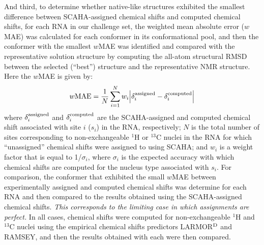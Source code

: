 \documentclass[journal=jcisd8,manuscript=article,layout=onecolumn]{achemso}
\begin{document}
And third, to determine whether native-like structures exhibited the smallest difference between SCAHA-assigned chemical shifts and computed chemical shifts, for each RNA in our challenge set, the weighted mean absolute error ($w$MAE) was calculated for each conformer in its conformational pool, and then the conformer with the smallest $w$MAE was identified and compared with the representative solution structure by computing the all-atom structural RMSD between the selected (``best'')  structure and the representative NMR structure.  Here the $w$MAE is given by:
\begin{equation}\label{eq:wmae} 
w{\rm MAE} =  \frac{1}{N} \sum_{i=1}^{N} w_{i} \Big{|} \delta_{i}^{\rm assigned} - \delta_{i}^{\rm computed}\Big{|}
\end{equation}
where $\delta_{i}^{\rm assigned}$ and $\delta_{i}^{\rm computed}$ are the SCAHA-assigned and computed chemical shift associated with site $i$ ($s_{i}$) in the RNA, respectively; $N$ is the total number of sites corresponding to non-exchangeable $^{1}$H or $^{13}$C nuclei in the RNA for which ``unassigned'' chemical shifts were assigned to using SCAHA; and $w_{i}$ is a weight factor that is equal to 1/$\sigma_{i}$, where $\sigma_{i}$ is the expected accuracy with which chemical shifts are computed for the nucleus type associated with $s_{i}$\cite{frank2016can}. For comparison, the conformer that exhibited the small $w$MAE between experimentally assigned and computed chemical shifts was determine for each RNA and then compared to the results obtained using the SCAHA-assigned chemical shifts. \textit{This corresponds to the limiting case in which assignments are perfect.} In all cases, chemical shifts were computed for non-exchangeable $^{1}$H and $^{13}$C nuclei using the empirical chemical shifts predictors LARMOR$^{\rm D}$ and RAMSEY, and then the results obtained with each were then compared.
\end{document}
